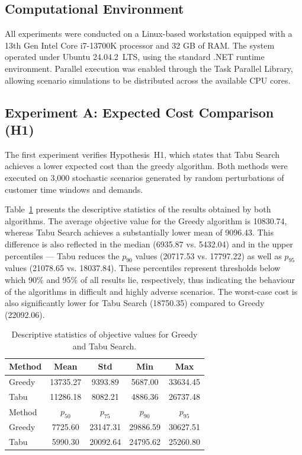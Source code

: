\subsection{Computational Environment}

All experiments were conducted on a Linux-based workstation equipped with a 13th Gen Intel Core i7-13700K processor and 32 GB of RAM. The system operated under Ubuntu 24.04.2~LTS, using the standard .NET runtime environment. Parallel execution was enabled through the Task Parallel Library, allowing scenario simulations to be distributed across the available CPU cores.



\subsection{Experiment A: Expected Cost Comparison (H1)}

The first experiment verifies Hypothesis~H1, which states that Tabu Search achieves a lower expected cost than the greedy algorithm. Both methods were executed on 3,000 stochastic scenarios generated by random perturbations of customer time windows and demands.

Table~\ref{tab:expA_summary} presents the descriptive statistics of the results obtained by both algorithms. 
The average objective value for the Greedy algorithm is 10830.74, whereas Tabu Search achieves a substantially lower mean of 9096.43. 
This difference is also reflected in the median (6935.87 vs. 5432.04) and in the upper percentiles — Tabu reduces the $p_{90}$ values (20717.53 vs. 17797.22) as well as $p_{95}$ values (21078.65 vs. 18037.84). 
These percentiles represent thresholds below which 90\% and 95\% of all results lie, respectively, thus indicating the behaviour of the algorithms in difficult and highly adverse scenarios. 
The worst-case cost is also significantly lower for Tabu Search (18750.35) compared to Greedy (22092.06).

\begin{table}[ht]
    \renewcommand{\arraystretch}{1.5}
    \caption{Descriptive statistics of objective values for Greedy and Tabu Search.}
    \label{tab:expA_summary}
    \centering
    \begin{tabular}{l|c|c|c|c}
        \hline\hline
        Method & Mean & Std & Min & Max \\
        \hline\hline
        Greedy & 13735.27 & 9393.89 & 5687.00 & 33634.45 \\ \hline
        Tabu   & 11286.18 & 8082.21 & 4886.36 & 26737.48 \\ 
        \hline\hline
        Method & $p_{50}$ & $p_{75}$ & $p_{90}$ & $p_{95}$ \\ \hline
        Greedy & 7725.60&23147.31&29886.59&30627.51 \\ \hline
        Tabu   & 5990.30&20092.64&24795.62&25260.80 \\
        \hline\hline
    \end{tabular}
\end{table}

